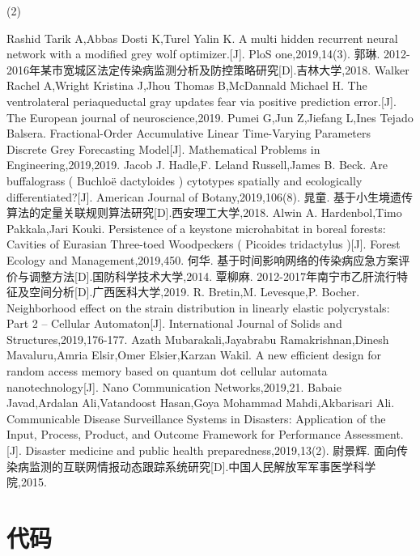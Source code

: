 \documentclass{whutmod}
\begin{document}
(2)
\begin{thebibliography}{9}
     Rashid Tarik A,Abbas Dosti K,Turel Yalin K. A multi hidden recurrent neural network with a modified grey wolf optimizer.[J]. PloS one,2019,14(3).
     郭琳. 2012-2016年某市宽城区法定传染病监测分析及防控策略研究[D].吉林大学,2018.
     Walker Rachel A,Wright Kristina J,Jhou Thomas B,McDannald Michael H. The ventrolateral periaqueductal gray updates fear via positive prediction error.[J]. The European journal of neuroscience,2019.
     Pumei G,Jun Z,Jiefang L,Ines Tejado Balsera. Fractional-Order Accumulative Linear Time-Varying Parameters Discrete Grey Forecasting Model[J]. Mathematical Problems in Engineering,2019,2019.
     Jacob J. Hadle,F. Leland Russell,James B. Beck. Are buffalograss ( Buchloë dactyloides ) cytotypes spatially and ecologically differentiated?[J]. American Journal of Botany,2019,106(8).
     晁童. 基于小生境遗传算法的定量关联规则算法研究[D].西安理工大学,2018.
     Alwin A. Hardenbol,Timo Pakkala,Jari Kouki. Persistence of a keystone microhabitat in boreal forests: Cavities of Eurasian Three-toed Woodpeckers ( Picoides tridactylus )[J]. Forest Ecology and Management,2019,450.
     何华. 基于时间影响网络的传染病应急方案评价与调整方法[D].国防科学技术大学,2014.
     覃柳麻. 2012-2017年南宁市乙肝流行特征及空间分析[D].广西医科大学,2019.
     R. Bretin,M. Levesque,P. Bocher. Neighborhood effect on the strain distribution in linearly elastic polycrystals: Part 2 – Cellular Automaton[J]. International Journal of Solids and Structures,2019,176-177.
     Azath Mubarakali,Jayabrabu Ramakrishnan,Dinesh Mavaluru,Amria Elsir,Omer Elsier,Karzan Wakil. A new efficient design for random access memory based on quantum dot cellular automata nanotechnology[J]. Nano Communication Networks,2019,21.
     Babaie Javad,Ardalan Ali,Vatandoost Hasan,Goya Mohammad Mahdi,Akbarisari Ali. Communicable Disease Surveillance Systems in Disasters: Application of the Input, Process, Product, and Outcome Framework for Performance Assessment.[J]. Disaster medicine and public health preparedness,2019,13(2).
    尉景辉. 面向传染病监测的互联网情报动态跟踪系统研究[D].中国人民解放军军事医学科学院,2015.
\end{thebibliography}

\section{代码}
\end{document}

